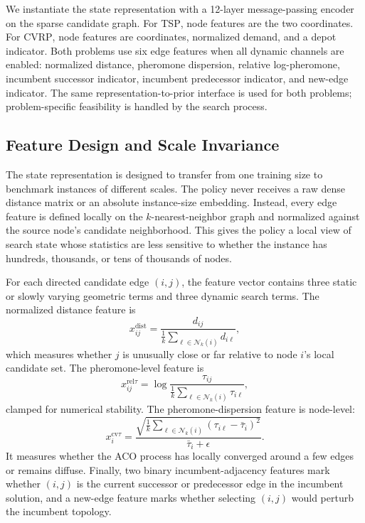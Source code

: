 \documentclass[11pt]{article}
\newcommand{\TSP}{\textsc{TSP}}
\newcommand{\CVRP}{\textsc{CVRP}}
\begin{document}
We instantiate the state representation with a 12-layer message-passing encoder on the sparse candidate graph.
For \TSP{}, node features are the two coordinates.
For \CVRP{}, node features are coordinates, normalized demand, and a depot indicator.
Both problems use six edge features when all dynamic channels are enabled: normalized distance, pheromone dispersion, relative log-pheromone, incumbent successor indicator, incumbent predecessor indicator, and new-edge indicator.
The same representation-to-prior interface is used for both problems; problem-specific feasibility is handled by the search process.

\subsection{Feature Design and Scale Invariance}
\label{sec:feature-design}

The state representation is designed to transfer from one training size to benchmark instances of different scales.
The policy never receives a raw dense distance matrix or an absolute instance-size embedding.
Instead, every edge feature is defined locally on the $k$-nearest-neighbor graph and normalized against the source node's candidate neighborhood.
This gives the policy a local view of search state whose statistics are less sensitive to whether the instance has hundreds, thousands, or tens of thousands of nodes.

For each directed candidate edge $(i,j)$, the feature vector contains three static or slowly varying geometric terms and three dynamic search terms.
The normalized distance feature is
\begin{equation}
x^{\mathrm{dist}}_{ij}
= \frac{d_{ij}}{\frac{1}{k}\sum_{\ell \in \mathcal{N}_k(i)} d_{i\ell}},
\end{equation}
which measures whether $j$ is unusually close or far relative to node $i$'s local candidate set.
The pheromone-level feature is
\begin{equation}
x^{\mathrm{rel}\tau}_{ij}
= \log \frac{\tau_{ij}}{\frac{1}{k}\sum_{\ell \in \mathcal{N}_k(i)} \tau_{i\ell}},
\end{equation}
clamped for numerical stability.
The pheromone-dispersion feature is node-level:
\begin{equation}
x^{\mathrm{cv}\tau}_{i}
= \frac{
\sqrt{\frac{1}{k}\sum_{\ell \in \mathcal{N}_k(i)}
(\tau_{i\ell}-\bar{\tau}_i)^2}}
{\bar{\tau}_i+\epsilon}.
\end{equation}
It measures whether the ACO process has locally converged around a few edges or remains diffuse.
Finally, two binary incumbent-adjacency features mark whether $(i,j)$ is the current successor or predecessor edge in the incumbent solution, and a new-edge feature marks whether selecting $(i,j)$ would perturb the incumbent topology.
\end{document}
